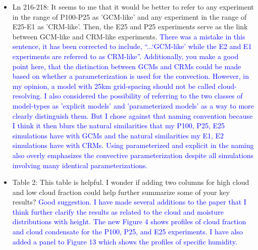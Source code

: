\documentclass[draft]{agujournal2019}
\begin{document}
\begin{itemize}
  \item Ln 216-218: It seems to me that it would be better to refer to any experiment in the range of P100-P25 as 'GCM-like' and any experiment in the range of E25-E1 as 'CRM-like'. Then, the E25 and P25 experiments serve as the link between GCM-like and CRM-like experiments.
  \textcolor{blue}{There was a mistake in this sentence, it has been corrected to include, ``...`GCM-like' while the E2 and E1
  experiments are referred to as CRM-like''. Additionally, you make a good point here, that the distinction between GCMs and CRMs could be made based on whether a 
  parameterization is used for the convection.  However, in my opinion, a model with 25km grid-spacing should not be called cloud-resolving.  I also considered the possibility of referring to the two classes of model-types as 'explicit models' and 'parameterized models' as a way to more clearly distinguish them.  But I chose against that naming convention because I think it then blurs the natural similarities that my P100, P25, E25 simulations have with GCMs and the natural similarities my E1, E2 simulations have with CRMs.  Using parameterized and explicit in the naming also overly emphasizes the convective parameterization despite all simulations involving many identical parameterizations.}
  
  \item Table 2:  This table is helpful. I wonder if adding two columns for high cloud and low cloud fraction could help further summarize some of your key results?
  \textcolor{blue}{Good suggestion.  I have made several additions to the paper that I think further clarify the results as related to the cloud and moisture 
  distributions with height.  The new Figure 4 shows profiles of cloud fraction and cloud condensate for the P100, P25, and E25 experiments.  I have also 
  added a panel to Figure 13 which  shows the profiles of specific humidity.}
  

\end{itemize}
\end{document}
